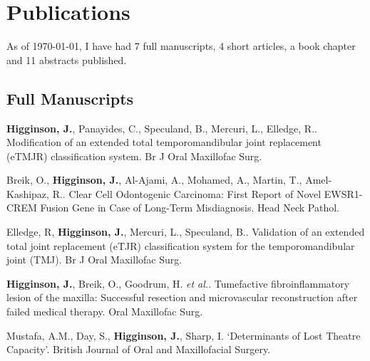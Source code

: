 \section*{Publications}
\label{publications}


As of \today, I have had 7 full manuscripts, 4 short articles, a book chapter and 11 abstracts published.

\subsection*{Full Manuscripts}

 \textbf{Higginson, J.}, Panayides, C., Speculand, B., Mercuri, L., Elledge, R.. Modification of an extended total temporomandibular joint replacement (eTMJR) classification system. Br J Oral Maxillofac Surg.
\\


 Breik, O., \textbf{Higginson, J.}, Al-Ajami, A., Mohamed, A., Martin, T., Amel-Kashipaz, R.. Clear Cell Odontogenic Carcinoma: First Report of Novel EWSR1-CREM Fusion Gene in Case of Long-Term Misdiagnosis. Head Neck Pathol. 
\\

\vspace{0.1cm}

 Elledge, R, \textbf{Higginson, J.}, Mercuri, L., Speculand, B.. Validation of an extended total joint replacement (eTJR) classification system for the temporomandibular joint (TMJ). Br J Oral Maxillofac Surg.
\\

\vspace{0.1cm}

\textbf{Higginson, J.}, Breik, O., Goodrum, H. \textit{et al.}. Tumefactive fibroinflammatory lesion of the maxilla: Successful resection and microvascular reconstruction after failed medical therapy. Oral Maxillofac Surg. 
\\

\vspace{0.1cm}

 Mustafa, A.M., Day, S., \textbf{Higginson, J.}, Sharp, I. `Determinants of Lost Theatre Capacity'. British Journal of Oral and Maxillofacial Surgery.
\\

